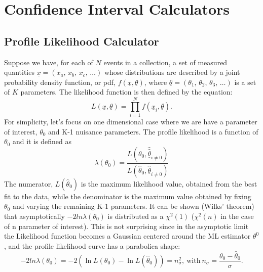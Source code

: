 \documentclass[11pt]{article}
\begin{document}
\section{Confidence Interval Calculators}

	\subsection{Profile Likelihood Calculator}\label{S:ProfileLikelihoodRatio}

Suppose we have, for each of $N$ events in a collection, a set of
measured quantities \mbox{$\underline{x}=(x_a,\,x_b,\,x_c,\,\ldots)$}
whose distributions are described by a joint probability density
function, or pdf, $f(\underline{x},\underline{\theta})$, where
$\underline{\theta}=(\theta_1,\,\theta_2,\,\theta_3,\,\ldots )$ is a
set of $K$ parameters. The likelihood function is then defined by
the equation:
\begin{equation}
    \label{likelihood}
    L(\underline{x},\underline{\theta})=\prod^{N}_{i=1}f({\underline{x}}_{i},\underline{\theta}).
\end{equation}
For simplicity, let's focus on one dimensional case where  we are have
a parameter of interest,  $\theta_{0}$ and K-1 nuisance parameters. 
The profile likelihood is a function of $\theta_{0}$ and it is defined as 
\begin{equation}
    \label{profile_likelihood}
\lambda(\theta_{0} ) = \frac{
  L(\theta_{0},\hat{\hat{\underline{\theta} } }_{i \neq 0}
     ) } 
{  L(\hat{\theta}_{0}, \hat{\underline{\theta}}_{i \neq
      0}   ) }
\end{equation}
The numerator, $ L(\hat{\theta}_{0} )$ is the maximum likelihood value,
obtained from the best fit to the data, while the denominator is the
maximum value obtained by fixing $\theta_{0}$ and varying the remaining
K-1 parameters.   
It can be shown (Wilks' theorem) that asymptotically
$-2ln\lambda(\theta_0)$ is distributed as a $\chi^2(1)$ ($\chi^2(n)$
in the case of n parameter of interest). This is not
surprising since in the asymptotic limit the Likelihood function
becomes a Gaussian centered around the ML estimator $\theta^0$, and
the profile likelihood curve has a parabolica shape: 
\begin{equation}
    \label{parabolicnll}
-2ln\lambda(\theta_0) = -2 (\ln{L(\theta_0)}-\ln{L(\hat{\theta}_0)}) = n_{\sigma}^{2},\ \mathrm{with}\ n_\sigma=\frac{\theta_{0}-\hat{\theta}_{0}}{\sigma}. 
\end{equation}
\end{document}

